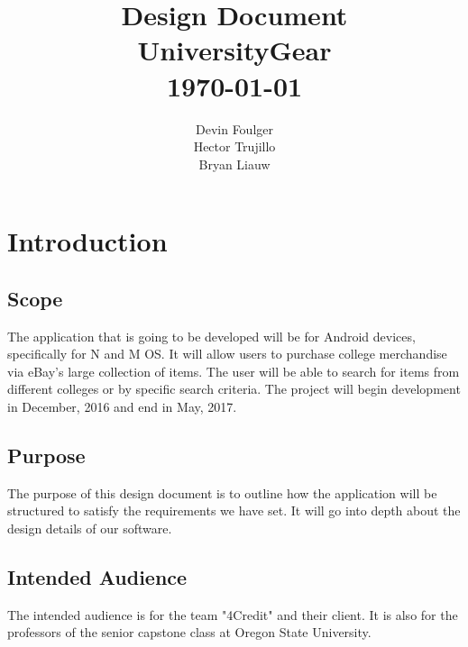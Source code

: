\documentclass[journal,compsoc, 10pt, draftclsnofoot, onecolumn]{IEEEtran}
\begin{document}
\title{\vspace{20em}Design Document \\{\vspace{-1ex}\huge UniversityGear} \\
{\large \today}}
\author{\vspace{10ex}Devin Foulger \\{\vspace{-1ex}Hector Trujillo}
\\{\vspace{-1ex}Bryan Liauw}}

\begin{titlepage}

\maketitle
\thispagestyle{empty}

\end{titlepage}

\tableofcontents


\section{Introduction}
\subsection{Scope}
The application that is going to be developed will be for Android devices, 
specifically for N and M OS. It will allow users to purchase college merchandise
 via eBay's large collection of items. The user will be able to search for items
 from different colleges or by specific search criteria. The project will begin 
development in December, 2016 and end in May, 2017.

\subsection{Purpose}
The purpose of this design document is to outline how the application will be 
structured to satisfy the requirements we have set. It will go into depth about 
the design details of our software.

\subsection{Intended Audience}
The intended audience is for the team "4Credit" and their client. It is also for
 the professors of the senior capstone class at Oregon State University.
\end{document}
